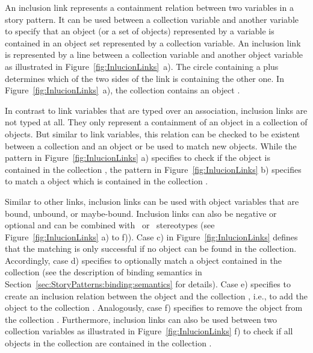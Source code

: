 An inclusion link represents a containment relation between two variables in a story pattern.
It can be used between a collection variable and another variable to specify that
an object (or a set of objects) represented by a variable is contained in an object set represented by a collection variable.
An inclusion link is represented by a line between a collection variable and another object
variable as illustrated in Figure~\ref{fig:InlucionLinks}~a).
The circle containing a plus determines which of the two sides of the link is containing the other one.
In Figure~\ref{fig:InlucionLinks}~a), the collection  contains an object .

In contrast to link variables that are typed over an association,
inclusion links are not typed at all.
They only represent a containment of an object in a collection of objects.
But similar to link variables, this relation can be checked to be existent between a collection and an object
or be used to match new objects.
While the pattern in Figure~\ref{fig:InlucionLinks} a) specifies to check if the object  is contained in the collection ,
the pattern in Figure~\ref{fig:InlucionLinks} b) specifies to match a  object which is contained in the collection .

Similar to other links, inclusion links can be used with object variables that are bound, unbound, or maybe-bound.
Inclusion links can also be negative or optional and can be combined with \create\ or \destroy\ stereotypes (see Figure~\ref{fig:InlucionLinks} a) to f)).
Case c) in Figure~\ref{fig:InlucionLinks} defines that the matching is only successful if no  object can be found in the  collection.
Accordingly, case d) specifies to optionally match a  object contained in the  collection
(see the description of binding semantics in Section~\ref{sec:StoryPatterns:binding:semantics} for details).
Case e) specifies to create an inclusion relation between the object  and the collection ,
i.e., to add the object  to the collection .
Analogously, case f) specifies to remove the object  from the collection .
Furthermore, inclusion links can also be used between two collection variables as illustrated in Figure~\ref{fig:InlucionLinks} f)
to check if all objects in the collection  are contained in the collection .

